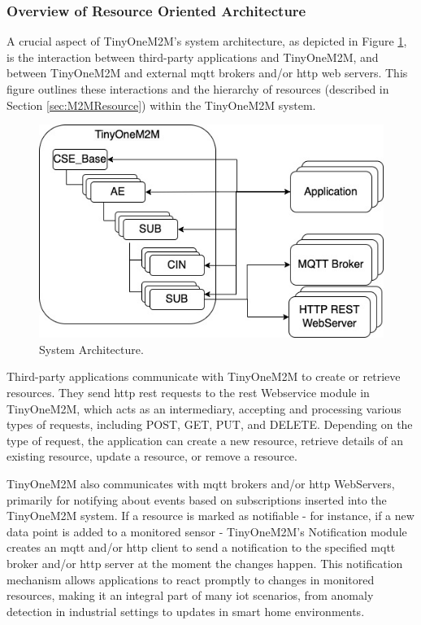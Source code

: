 \documentclass[a4paper,fleqn]{cas-dc}
\begin{document}
\subsubsection{Overview of Resource Oriented Architecture}

A crucial aspect of TinyOneM2M's system architecture, as depicted in Figure \ref{fig:systemarchitecture}, is the interaction between third-party applications and TinyOneM2M, and between TinyOneM2M and external \gls{mqtt} brokers and/or \gls{http} web servers. This figure outlines these interactions and the hierarchy of resources (described in Section \ref{sec:M2MResource}) within the TinyOneM2M system.

\begin{figure}[h]
	\centering
	\includegraphics[width=\linewidth]{SystemArchitectuRE.jpg}
	\caption{System Architecture.}
	\label{fig:systemarchitecture}
\end{figure}

Third-party applications communicate with TinyOneM2M to create or retrieve resources. They send \gls{http} \gls{rest} requests to the \gls{rest} Webservice module in TinyOneM2M, which acts as an intermediary, accepting and processing various types of requests, including POST, GET, PUT, and DELETE. Depending on the type of request, the application can create a new resource, retrieve details of an existing resource, update a resource, or remove a resource.

TinyOneM2M also communicates with \gls{mqtt} brokers and/or \gls{http} WebServers, primarily for notifying about events based on subscriptions inserted into the TinyOneM2M system. If a resource is marked as notifiable - for instance, if a new data point is added to a monitored sensor - TinyOneM2M's Notification module creates an \gls{mqtt} and/or \gls{http} client to send a notification to the specified \gls{mqtt} broker and/or \gls{http} server at the moment the changes happen. This notification mechanism allows applications to react promptly to changes in monitored resources, making it an integral part of many \gls{iot} scenarios, from anomaly detection in industrial settings to updates in smart home environments.
\end{document}
